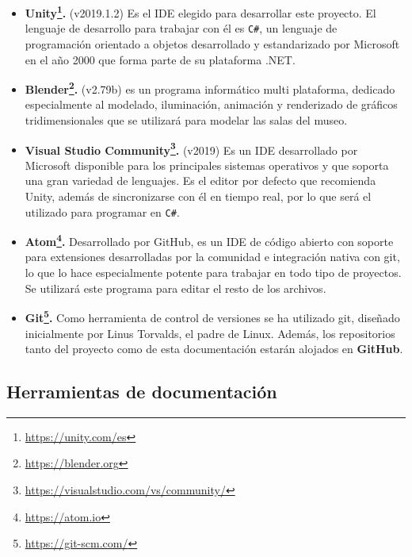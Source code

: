 \begin{itemize}
    \item \textbf{Unity\footnote{\url{https://unity.com/es}}.} (v2019.1.2) Es el \acs{IDE} elegido para desarrollar este proyecto. El lenguaje de desarrollo para trabajar con él es \texttt{C\#}, un lenguaje de programación orientado a objetos desarrollado y estandarizado por Microsoft  en el año 2000 que forma parte de su plataforma .NET.
    
    \item \textbf{Blender\footnote{\url{https://blender.org}}.} (v2.79b) es un programa informático multi plataforma, dedicado especialmente al modelado, iluminación, animación y renderizado de gráficos tridimensionales que se utilizará para modelar las salas del museo.
    
    \item \textbf{Visual Studio Community\footnote{\url{https://visualstudio.com/vs/community/}}.} (v2019) Es un \acs{IDE} desarrollado por Microsoft disponible para los principales sistemas operativos y que soporta una gran variedad de lenguajes. Es el editor por defecto que recomienda Unity, además de sincronizarse con él en tiempo real, por lo que será el utilizado para programar en \texttt{C\#}.
    
    \item \textbf{Atom\footnote{\url{https://atom.io}}.} Desarrollado por GitHub, es un \acs{IDE} de código abierto con soporte para extensiones desarrolladas por la comunidad e integración nativa con git, lo que lo hace especialmente potente para trabajar en todo tipo de proyectos. Se utilizará este programa para editar el resto de los archivos.
    
    \item \textbf{Git\footnote{\url{https://git-scm.com/}}.} Como herramienta de control de versiones se ha utilizado git, diseñado inicialmente por Linus Torvalds, el padre de Linux. Además, los repositorios tanto del proyecto como de esta documentación estarán alojados en \textbf{GitHub}.
    
\end{itemize}

\subsection{Herramientas de documentación}

